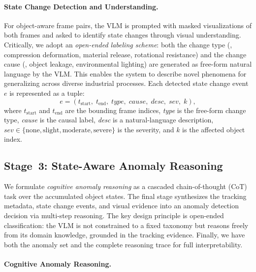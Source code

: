 \documentclass[runningheads]{llncs}
\begin{document}
\paragraph{\textbf{State Change Detection and Understanding.}}
For object-aware frame pairs, the VLM is prompted with masked visualizations of both frames and asked to identify state changes through visual understanding.
% 
Critically, we adopt an \textit{open-ended labeling scheme}: both the change type (\eg, compression deformation, material release, rotational resistance) and the change cause (\eg, object leakage, environmental lighting) are generated as free-form natural language by the VLM. This enables the system to describe novel phenomena for generalizing across diverse industrial processes.
% 
Each detected state change event $e$ is represented as a tuple:
%
\begin{equation}
   e=(t_{\text{start}},\; t_{\text{end}},\; \textit{type},\; \textit{cause},\; \textit{desc},\; \textit{sev},\; k),
   \label{eq:state_event}
\end{equation}
%
where $t_{\text{start}}$ and $t_{\text{end}}$ are the bounding frame indices, \textit{type} is the free-form change type, \textit{cause} is the causal label, \textit{desc} is a natural-language description, $\textit{sev} \in \{\text{none}, \text{slight}, \text{moderate}, \text{severe}\}$ is the severity, and $k$ is the affected object index.


\subsection{Stage~3: State-Aware Anomaly Reasoning}
\label{sec:stage3}

We formulate \textit{cognitive anomaly reasoning} as a cascaded chain-of-thought (CoT) task over the accumulated object states. 
The final stage synthesizes the tracking metadata, state change events, and visual evidence into an anomaly detection decision via multi-step reasoning. 
The key design principle is open-ended classification: the VLM is not constrained to a fixed taxonomy but reasons freely from its domain knowledge, grounded in the tracking evidence.
Finally, we have both the anomaly set and the complete reasoning trace for full interpretability.


\paragraph{\textbf{Cognitive Anomaly Reasoning.}}
\label{sec:cot}
\end{document}
